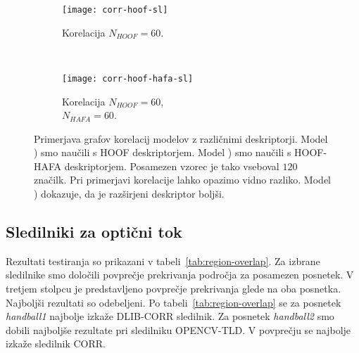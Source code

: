 \begin{figure}[!htbp]
	\centering
	\begin{subfigure}[t]{0.45\columnwidth}
		\texttt{[image: corr-hoof-sl]}
		\caption{Korelacija $N_{HOOF}=60$.}
		\label{fig:izbira-hoof}
	\end{subfigure}
	~
	\begin{subfigure}[t]{0.45\columnwidth}
		\texttt{[image: corr-hoof-hafa-sl]}
		\caption{Korelacija $N_{HOOF}=60$,\\$N_{HAFA}=60$.}
		\label{fig:izbira-hoofhafa}
	\end{subfigure}
	\caption[Primerjava modelov s HOOF in HOOF-HAFA deskriptorji]{Primerjava grafov korelacij modelov z različnimi deskriptorji. Model ) smo naučili s HOOF deskriptorjem. Model ) smo naučili s HOOF-HAFA deskriptorjem. Posamezen vzorec je tako vseboval $120$ značilk. Pri primerjavi korelacije lahko opazimo vidno razliko. Model ) dokazuje, da je razširjeni deskriptor boljši.}
	\label{fig:izbira}
\end{figure}




















\subsection{Sledilniki za optični tok} \label{sec:rezultati-sledilnikov-za-opticni-tok}


Rezultati testiranja so prikazani v tabeli~\ref{tab:region-overlap}. Za izbrane sledilnike smo določili povprečje prekrivanja področja za posamezen posnetek. V tretjem stolpcu je predstavljeno povprečje prekrivanja glede na oba posnetka. Najboljši rezultati so odebeljeni. Po tabeli~\ref{tab:region-overlap} se za posnetek \textit{handball1} najbolje izkaže DLIB-CORR sledilnik. Za posnetek \textit{handball2} smo dobili najboljše rezultate pri sledilniku OPENCV-TLD. V povprečju se najbolje izkaže sledilnik CORR.





